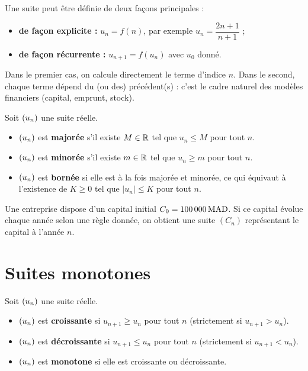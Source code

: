 \documentclass[12pt,a4paper]{article}
\begin{document}
\begin{remarquebox}
Une suite peut être définie de deux façons principales :
\begin{itemize}
  \item \textbf{de façon explicite :} $u_n = f(n)$, par exemple $u_n = \dfrac{2n+1}{n+1}$ ;
  \item \textbf{de façon récurrente :} $u_{n+1} = f(u_n)$ avec $u_0$ donné.
\end{itemize}
Dans le premier cas, on calcule directement le terme d'indice $n$. Dans le second, chaque terme dépend du (ou des) précédent(s) : c'est le cadre naturel des modèles financiers (capital, emprunt, stock).
\end{remarquebox}

\begin{definitionbox}
Soit $(u_n)$ une suite réelle.
\begin{itemize}
  \item $(u_n)$ est \textbf{majorée} s'il existe $M\in\mathbb{R}$ tel que $u_n \leq M$ pour tout $n$.
  \item $(u_n)$ est \textbf{minorée} s'il existe $m\in\mathbb{R}$ tel que $u_n \geq m$ pour tout $n$.
  \item $(u_n)$ est \textbf{bornée} si elle est à la fois majorée et minorée, ce qui équivaut à l'existence de $K\geq 0$ tel que $\lvert u_n\rvert \leq K$ pour tout $n$.
\end{itemize}
\end{definitionbox}

\begin{exemplebox}
Une entreprise dispose d'un capital initial $C_0 = 100\,000\,\mathrm{MAD}$. Si ce capital évolue chaque année selon une règle donnée, on obtient une suite $(C_n)$ représentant le capital à l'année $n$.
\end{exemplebox}

\section{Suites monotones}

\begin{definitionbox}[2.1 -- Monotonie]
Soit $(u_n)$ une suite réelle.
\begin{itemize}
  \item $(u_n)$ est \textbf{croissante} si $u_{n+1} \geq u_n$ pour tout $n$ (strictement si $u_{n+1} > u_n$).
  \item $(u_n)$ est \textbf{décroissante} si $u_{n+1} \leq u_n$ pour tout $n$ (strictement si $u_{n+1} < u_n$).
  \item $(u_n)$ est \textbf{monotone} si elle est croissante ou décroissante.
\end{itemize}
\end{definitionbox}
\end{document}
